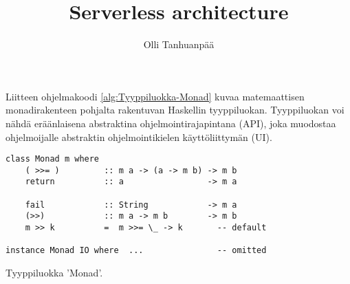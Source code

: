 \documentclass[language=finnish,version=final,mainfont=none,sharelatex=false]{utuftthesis}
\providecommand{\algorithmname}{Algoritmi}
\begin{document}
\title{Serverless architecture}
\author{Olli Tanhuanpää}

\maketitle


\tableofcontents

\listofacronyms

\renewcommand{\algorithmname}{\listingscaption}


\begin{comment}
To better organize things, create a new tex file for each chapter
and input it below.

Avoid using the å, ä, ö or <space> characters in referred names and
underscores \_ in file names (may break hyperref).

Good luck!
\end{comment}









%
%


\printbibliography

\begin{comment}
Important! Create the appendix chapters with command \textbackslash appchapter\{some
name\} instead of \textbackslash chapter\{some name\} for the automagic
page counting to work!
\end{comment}



Liitteen ohjelmakoodi \ref{alg:Tyyppiluokka-Monad} kuvaa matemaattisen
monadirakenteen pohjalta rakentuvan Haskellin tyyppiluokan. Tyyppiluokan
voi nähdä eräänlaisena abstraktina ohjelmointirajapintana (API),
joka muodostaa ohjelmoijalle abstraktin ohjelmointikielen käyttöliittymän
(UI).

\begin{algorithm}[tbh]
\begin{verbatim}
class Monad m where
    ( >>= )         :: m a -> (a -> m b) -> m b
    return          :: a                 -> m a

    fail            :: String            -> m a
    (>>)            :: m a -> m b        -> m b
    m >> k          =  m >>= \_ -> k       -- default

instance Monad IO where  ...               -- omitted
\end{verbatim}

\caption{Tyyppiluokka 'Monad'.\label{alg:Tyyppiluokka-Monad}}
\end{algorithm}
\end{document}
